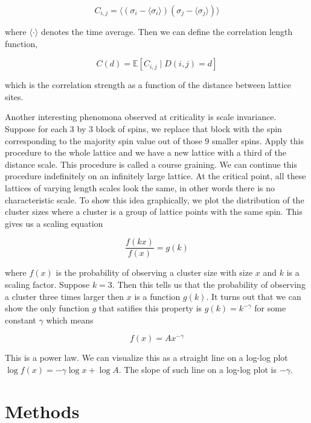 \documentclass{article}
\begin{document}
\begin{equation}
    C_{i,j} = \langle (\sigma_i - \langle \sigma_i \rangle)(\sigma_j - \langle \sigma_j \rangle) \rangle
\end{equation}

where $\langle \cdot \rangle$ denotes the time average. Then we can define the correlation length function,

\begin{equation}
    C(d) = \mathbb{E} \left[ C_{i,j} \mid D(i,j) = d \right]
\end{equation}

which is the correlation strength as a function of the distance between lattice sites.

Another interesting phenomona observed at criticality is scale invariance. Suppose for each 3 by 3 block of spins, we replace that block
with the spin corresponding to the majority spin value out of those 9 smaller spins. Apply this procedure to the whole lattice and we have
a new lattice with a third of the distance scale. This procedure is called a course graining. We can continue this procedure indefinitely on an 
infinitely large lattice. At the critical point, all these lattices of varying length scales look the same, in other words there is no 
characteristic scale. To show this idea graphically, we plot the distribution of the cluster sizes where a cluster is a group of lattice points with
the same spin. This gives us a scaling equation 

\begin{equation}
    \frac{f(kx)}{f(x)} = g(k)
\end{equation}

where $f(x)$ is the probability of observing a cluster size with size $x$ and $k$ is a scaling factor.
Suppose $k=3$. Then this tells us that the probability of observing a cluster three times larger then $x$
is a function $g(k)$. It turns out that we can show the only function $g$ that satifies this property is
$g(k) = k^{-\gamma}$ for some constant $\gamma$ which means


\begin{equation}
    f(x) = A x^{-\gamma}
\end{equation}

This is a power law. We can visualize this as a straight line on a log-log plot $\log f(x) = -\gamma \log x + \log A$.
The slope of such line on a log-log plot is $-\gamma$.
 
\section{Methods}
\label{Methods}
\end{document}
